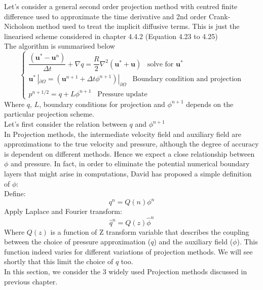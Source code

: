 Let's consider a general second order projection method with centred finite difference used to approximate the time derivative and 2nd order Crank-Nicholson method used to treat the implicit diffusive terms. This is just the linearised scheme considered in chapter 4.4.2 (Equation 4.23 to 4.25)\\

The algorithm is summarised below\\
\begin{equation}
\begin{cases}
\dfrac{(\textbf{u}^* - \textbf{u}^n)}{\Delta t} + \nabla q = \dfrac{R}{2} \nabla^2 (\textbf{u}^* + \textbf{u})\,\,\,\text{   solve for $\textbf{u}^*$}\\
\textbf{u}^* \,|_{\partial \Omega}= \left(\textbf{u}^{n+1} + \Delta t \phi^{n+1}\right)|_{\partial \Omega}\,\,\,\text{   Boundary condition and projection}\\
p^{n+1/2} = q + L \phi^{n+1}\,\,\,\text{   Pressure update}
\end{cases}
\end{equation}
Where $q, \,L$, boundary conditions for projection and $\phi^{n+1}$ depends on the particular projection scheme.\\

Let's first consider the relation between $q$ and $\phi^{n+1}$\\
In Projection methods, the intermediate velocity field and auxiliary field are approximations to the true velocity and pressure, although the degree of accuracy is dependent on different methods. Hence we expect a close relationship between $\phi$ and pressure. In fact, in order to eliminate the potential numerical boundary layers that might arise in computations, David has proposed a simple definition of $\phi$:\\
Define:
\begin{equation*}
q^n = Q(n) \phi^n
\end{equation*}
Apply Laplace and Fourier transform:
\begin{equation}
\hat{q}^n = Q(z) \hat{\phi}^n
\end{equation}
Where $Q(z)$ is a function of Z transform variable that describes the coupling between the choice of pressure approximation ($q$) and the auxiliary field ($\phi$). This function indeed varies for different variations of projection methods. We will see shortly that this limit the choice of $q$ too.\\

In this section, we consider the 3 widely used Projection methods discussed in previous chapter.

